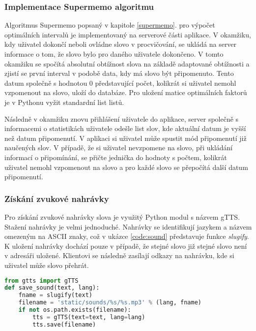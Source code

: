 \documentclass[a4paper,11pt,titlepage,fleqn]{article}
\begin{document}
        \subsubsection{Implementace Supermemo algoritmu}
            Algoritmus Supermemo popsaný v kapitole \ref{supermemo}. pro výpočet optimálních intervalů je implementovaný na serverové části aplikace. V okamžiku, kdy uživatel dokončí neboli ovládne slovo v procvičování, se ukládá na server informace o tom, že slovo bylo pro daného uživatele dokončeno. V tomto okamžiku se spočítá absolutní obtížnost slova na základě adaptované obtížnosti a zjistí se první interval v podobě data, kdy má slovo být připomenuto. Tento datum společně s hodnotou 0 představující počet, kolikrát si uživatel nemohl vzpomenout na slovo, uloží do databáze. Pro uložení matice optimálních faktorů je v Pythonu vyžit standardní list listů.

            Následně v okamžiku znovu přihlášení uživatele do aplikace, server společně s informacemi o statistikách uživatele odešle list slov, kde aktuální datum je vyšší než datum připomenutí. V aplikaci si uživatel může spustit mód připomenutí již naučených slov. V případě, že si uživatel nevzpomene na slovo, při ukládání informací o připomínání, se přičte jednička do hodnoty s počtem, kolikrát uživatel nemohl vzpomenout na slovo a pro každé slovo se přepočítá další datum připomenutí. 

        \subsubsection{Získání zvukové nahrávky}
            Pro získání zvukové nahrávky slova je využitý Python modul s názvem gTTS. Stažení nahrávky je velmi jednoduché. Nahrávky se identifikují jazykem a názvem omezeným na ASCII znaky, což v ukázce \ref{code:sound} představuje funkce \textit{slugify}. K uložení nahrávky dochází pouze v případě, že stejné slovo již stejné slovo není v adresáři uložené. Klientovi se následně zasílají odkazy na nahrávku, kde si uživatel může slovo přehrát.

\begin{lstlisting}[language=Python, caption={Uložení zvukové nahrávky},label=code:sound]
from gtts import gTTS
def save_sound(text, lang):
    fname = slugify(text)
    filename = 'static/sounds/%s/%s.mp3' % (lang, fname)
    if not os.path.exists(filename):
        tts = gTTS(text=text, lang=lang)
        tts.save(filename)
\end{lstlisting}
\end{document}
